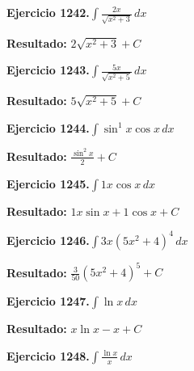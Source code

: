 \documentclass[10pt,a4paper]{article}
\begin{document}
\begin{ejbox}
\textbf{Ejercicio 1242.}\quad $\int \frac{2x}{\sqrt{x^2+3}}\,dx$
\end{ejbox}

\begin{solbox}
\textbf{Resultado:} \(\displaystyle 2\sqrt{x^2+3} + C\)
\end{solbox}

\newpage
\begin{ejbox}
\textbf{Ejercicio 1243.}\quad $\int \frac{5x}{\sqrt{x^2+5}}\,dx$
\end{ejbox}

\begin{solbox}
\textbf{Resultado:} \(\displaystyle 5\sqrt{x^2+5} + C\)
\end{solbox}

\begin{ejbox}
\textbf{Ejercicio 1244.}\quad $\int \sin^{1}x \cos x\,dx$
\end{ejbox}

\begin{solbox}
\textbf{Resultado:} \(\displaystyle \frac{\sin^{2}x}{2} + C\)
\end{solbox}

\begin{ejbox}
\textbf{Ejercicio 1245.}\quad $\int 1x \cos x\,dx$
\end{ejbox}

\begin{solbox}
\textbf{Resultado:} \(\displaystyle 1x\sin x + 1\cos x + C\)
\end{solbox}

\newpage
\begin{ejbox}
\textbf{Ejercicio 1246.}\quad $\int 3x(5x^2 + 4)^{4}\,dx$
\end{ejbox}

\begin{solbox}
\textbf{Resultado:} \(\displaystyle \frac{3}{50}(5x^2+4)^{5} + C\)
\end{solbox}

\begin{ejbox}
\textbf{Ejercicio 1247.}\quad $\int \ln x\,dx$
\end{ejbox}

\begin{solbox}
\textbf{Resultado:} \(\displaystyle x\ln x - x + C\)
\end{solbox}

\begin{ejbox}
\textbf{Ejercicio 1248.}\quad $\int \frac{\ln x}{x}\,dx$
\end{ejbox}
\end{document}
